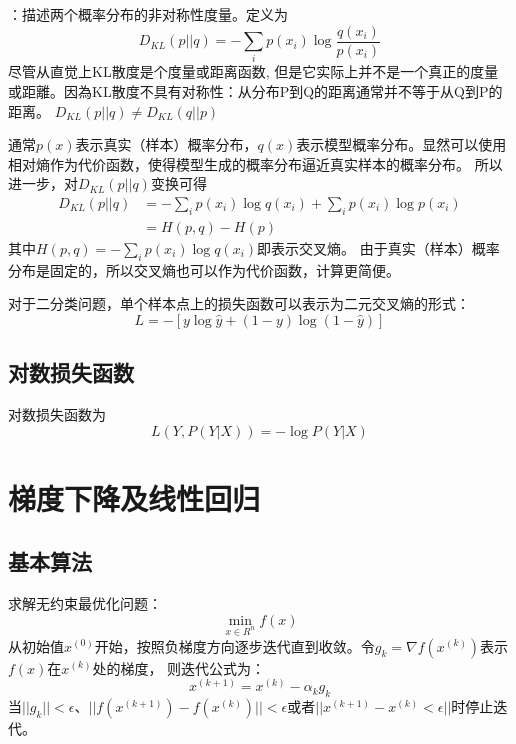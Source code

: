 {}：描述两个概率分布的非对称性度量。定义为
\begin{equation*}
    D_{KL}(p||q) = -\sum_i p(x_i) \log \frac{q(x_i)}{p(x_i)}
\end{equation*}
{\color{red}尽管从直觉上KL散度是个度量或距离函数, 但是它实际上并不是一个真正的度量或距離。因為KL散度不具有对称性：从分布P到Q的距离通常并不等于从Q到P的距离。
$D_{KL}(p||q) \neq D_{KL}(q||p)$} 

通常$p(x)$表示真实（样本）概率分布，$q(x)$表示模型概率分布。显然可以使用相对熵作为代价函数，使得模型生成的概率分布逼近真实样本的概率分布。
所以进一步，对$D_{KL}(p||q)$变换可得
\begin{align*}
    D_{KL}(p||q) &= -\sum_i p(x_i) \log q(x_i) + \sum_i p(x_i) \log p(x_i) \\
    &= H(p,q) - H(p)
\end{align*}
其中$H(p,q) = -\sum_i p(x_i) \log q(x_i)$即表示交叉熵。
由于真实（样本）概率分布是固定的，所以交叉熵也可以作为代价函数，计算更简便。

对于二分类问题，单个样本点上的损失函数可以表示为二元交叉熵的形式：
\begin{equation*}
    L = -[y\log \hat{y} + (1-y)\log (1-\hat{y})]
\end{equation*}

\subsection{对数损失函数}
对数损失函数为
\begin{equation*}
    L(Y, P(Y|X)) = -\log P(Y|X)
\end{equation*}

\section{梯度下降及线性回归}
\subsection{基本算法}
求解无约束最优化问题：
\begin{equation*}
    \min_{x \in R^n} f(x)
\end{equation*}
从初始值$x^{(0)}$开始，按照负梯度方向逐步迭代直到收敛。令$g_k = \nabla f(x^{(k)})$表示$f(x)$在$x^{(k)}$处的梯度，
则迭代公式为：
\begin{equation*}
    x^{(k+1)} = x^{(k)} - \alpha_k g_k
\end{equation*}
当$||g_k|| < \epsilon$、$||f(x^{(k+1)}) - f(x^{(k)})|| < \epsilon$或者$||x^{(k+1)} - x^{(k)} < \epsilon||$时停止迭代。

